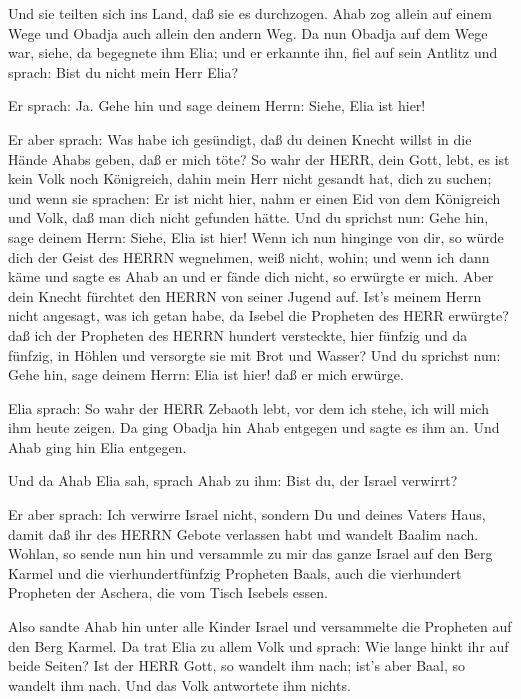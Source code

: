  Und sie teilten sich ins Land, daß sie es durchzogen. Ahab
zog allein auf einem Wege und Obadja auch allein den andern Weg.
 Da nun Obadja auf dem Wege war, siehe, da begegnete ihm
Elia; und er erkannte ihn, fiel auf sein Antlitz und sprach: Bist du
nicht mein Herr Elia?

 Er sprach: Ja. Gehe hin und sage deinem Herrn: Siehe, Elia
ist hier!

 Er aber sprach: Was habe ich gesündigt, daß du deinen
Knecht willst in die Hände Ahabs geben, daß er mich töte? 
So wahr der HERR, dein Gott, lebt, es ist kein Volk noch Königreich,
dahin mein Herr nicht gesandt hat, dich zu suchen; und wenn sie
sprachen: Er ist nicht hier, nahm er einen Eid von dem Königreich und
Volk, daß man dich nicht gefunden hätte.  Und du sprichst
nun: Gehe hin, sage deinem Herrn: Siehe, Elia ist hier! 
Wenn ich nun hinginge von dir, so würde dich der Geist des HERRN
wegnehmen, weiß nicht, wohin; und wenn ich dann käme und sagte es Ahab
an und er fände dich nicht, so erwürgte er mich. Aber dein Knecht
fürchtet den HERRN von seiner Jugend auf.  Ist's meinem
Herrn nicht angesagt, was ich getan habe, da Isebel die Propheten des
HERR erwürgte? daß ich der Propheten des HERRN hundert versteckte, hier
fünfzig und da fünfzig, in Höhlen und versorgte sie mit Brot und Wasser?
 Und du sprichst nun: Gehe hin, sage deinem Herrn: Elia ist
hier! daß er mich erwürge.

 Elia sprach: So wahr der HERR Zebaoth lebt, vor dem ich
stehe, ich will mich ihm heute zeigen.  Da ging Obadja hin
Ahab entgegen und sagte es ihm an. Und Ahab ging hin Elia entgegen.

 Und da Ahab Elia sah, sprach Ahab zu ihm: Bist du, der
Israel verwirrt?

 Er aber sprach: Ich verwirre Israel nicht, sondern Du und
deines Vaters Haus, damit daß ihr des HERRN Gebote verlassen habt und
wandelt Baalim nach.  Wohlan, so sende nun hin und
versammle zu mir das ganze Israel auf den Berg Karmel und die
vierhundertfünfzig Propheten Baals, auch die vierhundert Propheten der
Aschera, die vom Tisch Isebels essen.

 Also sandte Ahab hin unter alle Kinder Israel und
versammelte die Propheten auf den Berg Karmel.  Da trat
Elia zu allem Volk und sprach: Wie lange hinkt ihr auf beide Seiten? Ist
der HERR Gott, so wandelt ihm nach; ist's aber Baal, so wandelt ihm
nach. Und das Volk antwortete ihm nichts.

